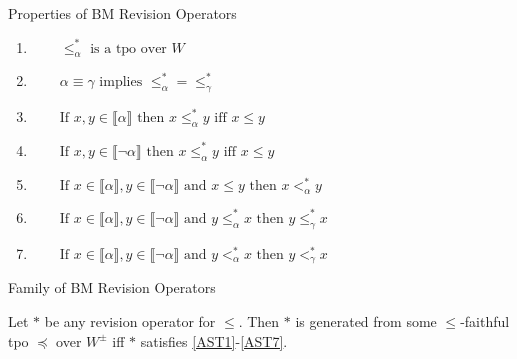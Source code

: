 \documentclass[11pt]{beamer}
\newcommand{\modelsOf}[1]{\llbracket #1 \rrbracket}
\begin{document}
\begin{frame}{Properties of BM Revision Operators}
    \begin{enumerate}[wide=0pt, widest=99,leftmargin=\parindent,label = ($\ast\arabic*$)]
        \item\label{AST1} $\qquad \leq_{\alpha}^{\ast} \textrm{ is a tpo over } W$
        \item\label{AST2} $\qquad\alpha \equiv \gamma \textrm{ implies } \leq_{\alpha}^{\ast}=\leq_{\gamma}^{\ast}$
        \item\label{AST3} $\qquad \textrm{If } x, y \in \modelsOf{\alpha} \textrm{ then } x \leq_{\alpha}^{\ast} y \textrm{ iff } x \leq y$
        \item\label{AST4} $\qquad \textrm{If } x, y \in \modelsOf{\neg\alpha} \textrm{ then } x \leq_{\alpha}^{\ast} y \textrm{ iff } x \leq y$
        \item\label{AST5} $\qquad \textrm{If } x \in \modelsOf{\alpha}, y \in \modelsOf{\neg\alpha} \textrm{ and } x \leq y \textrm{ then } x <_{\alpha}^{\ast} y$
        \item\label{AST6} $\qquad \textrm{If } x \in \modelsOf{\alpha}, y \in \modelsOf{\neg\alpha} \textrm{ and } y \leq_{\alpha}^{\ast} x \textrm{ then } y \leq_{\gamma}^{\ast} x$
        \item\label{AST7} $\qquad \textrm{If } x \in \modelsOf{\alpha}, y \in \modelsOf{\neg\alpha} \textrm{ and } y <_{\alpha}^{\ast} x \textrm{ then } y <_{\gamma}^{\ast} x$
    \end{enumerate}

\end{frame}

\begin{frame}{Family of BM Revision Operators}
    \begin{theorem}
        \label{theorem:revision-operator}Let $\ast$ be any revision operator for $\leq$. Then $\ast$ is generated from some $\leq$-faithful tpo $\preceq$ over $W^{\pm}$ iff $\ast$ satisfies \ref{AST1}-\ref{AST7}. \cite{Booth2011}
    \end{theorem}

\end{frame}
\end{document}
